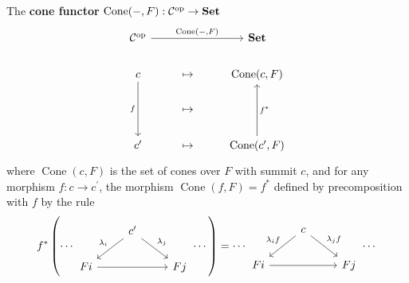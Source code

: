 \documentclass[12pt, oneside]{book}
\begin{document}
\begin{definition}
    The \textbf{cone functor} $\operatorname{Cone}(-, F): \mathcal{C}^{\mathrm{op}} \rightarrow  \mathbf{Set}$
    \begin{equation*}
        \begin{tikzcd}
            \mathcal{C}^{\mathrm{op}} \arrow[rr, "{\operatorname{Cone}(-, F)}"] & & \mathbf{Set} \\
            c \arrow[dd,"f"'] & \mapsto & \operatorname{Cone}(c, F) \\
            &\mapsto & \\
            c^\prime& \mapsto & \operatorname{Cone}(c^\prime, F) \arrow[uu,"f^*"']
        \end{tikzcd}
    \end{equation*}
    where $\operatorname{Cone}(c, F)$ is the set of cones over $F$ with summit $c$,
    and for any morphism $f:  c\rightarrow c^{\prime}$, the morphism $\operatorname{Cone}\left(f,F\right)=f^*$ defined by precomposition with $f$ by the rule
    \begin{equation*}
        f^*\left(\cdots
        \begin{tikzcd}
            &c^\prime\arrow[ld,"\lambda_i"']\arrow[rd,"\lambda_j"]&\\
            Fi\arrow[rr,""]&&Fj
        \end{tikzcd}
        \cdots\right)
        =\cdots
        \begin{tikzcd}
            &c\arrow[ld,"\lambda_if"']\arrow[rd,"\lambda_jf"]&\\
            Fi\arrow[rr,""]&&Fj
        \end{tikzcd}
        \cdots
    \end{equation*}
\end{definition}
\end{document}
